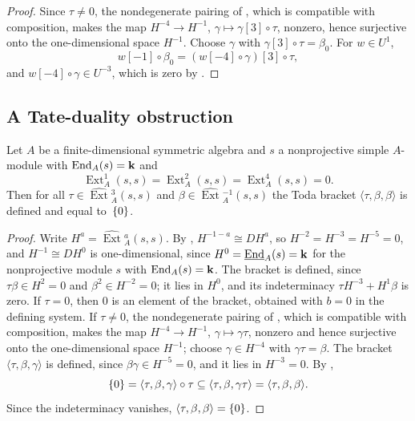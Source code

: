 \begin{proof}
  Since ${\tau\neq0}$, the nondegenerate pairing of ,
  which is compatible with composition, makes the map ${H^{-4}\to H^{-1}}$,
  ${\gamma\mapsto\gamma[3]\circ\tau}$, nonzero, hence surjective onto the
  one-dimensional space $H^{-1}$. Choose $\gamma$ with
  ${\gamma[3]\circ\tau=\beta_0}$. For ${w\in U^1}$,
  \[
    w[-1]\circ\beta_0=(w[-4]\circ\gamma)[3]\circ\tau,
  \]
  and ${w[-4]\circ\gamma\in U^{-3}}$, which is zero by .
\end{proof}

\subsection{A Tate-duality obstruction}
\label{subsec:tate-obstruction}

\begin{theorem}
  \label{thm:tate-obstruction}
  Let $A$ be a finite-dimensional symmetric algebra and $s$ a nonprojective
  simple $A$-module with ${\operatorname{End}_A(s)=\mathbf{k}}$ and
  \[
    \operatorname{Ext}^1_A(s,s)=\operatorname{Ext}^2_A(s,s)=
    \operatorname{Ext}^4_A(s,s)=0.
  \]
  Then for all ${\tau\in\widehat{\operatorname{Ext}}{}^3_A(s,s)}$ and
  ${\beta\in\widehat{\operatorname{Ext}}{}^{-1}_A(s,s)}$ the Toda bracket
  $\langle\tau,\beta,\beta\rangle$ is defined and equal to~$\set{0}$.
\end{theorem}

\begin{proof}
  Write ${H^a}={\widehat{\operatorname{Ext}}{}^a_A(s,s)}$. By
  , ${H^{-1-a}\cong DH^a}$, so ${H^{-2}}={H^{-3}}={H^{-5}}={0}$,
  and ${H^{-1}\cong DH^0}$ is one-dimensional, since ${H^0}={
  \underline{\operatorname{End}}_A(s)}={\mathbf{k}}$ for the nonprojective module $s$
  with ${\operatorname{End}_A(s)}={\mathbf{k}}$. The bracket is defined, since
  ${\tau\beta\in H^2=0}$ and ${\beta^2\in H^{-2}=0}$; it lies in $H^0$, and its
  indeterminacy ${\tau H^{-3}+H^1\beta}$ is zero. If ${\tau=0}$, then $0$ is an
  element of the bracket, obtained with ${b=0}$ in the defining system. If
  ${\tau\neq0}$, the nondegenerate pairing of , which is
  compatible with composition, makes the map ${H^{-4}\to H^{-1}}$,
  ${\gamma}\mapsto{\gamma\tau}$, nonzero and hence surjective onto the
  one-dimensional space $H^{-1}$; choose ${\gamma\in H^{-4}}$ with
  ${\gamma\tau=\beta}$. The bracket $\langle\tau,\beta,\gamma\rangle$ is defined,
  since ${\beta\gamma}\in{ H^{-5}}={0}$, and it lies in ${H^{-3}=0}$. By
  ,
  \[
    \set{0}=\langle\tau,\beta,\gamma\rangle\circ\tau\subseteq
    \langle\tau,\beta,\gamma\tau\rangle=\langle\tau,\beta,\beta\rangle.
  \]
  Since the indeterminacy vanishes, ${\langle\tau,\beta,\beta\rangle=\set{0}}$.
\end{proof}

